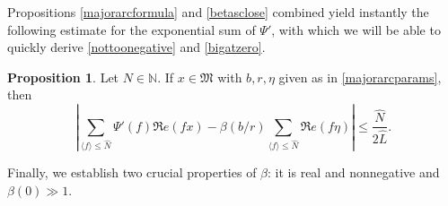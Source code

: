 \documentclass{article}
\theoremstyle{definition}
\newtheorem{prop}{Proposition}[section]
\theoremstyle{definition}
\theoremstyle{remark}
\newcommand{\N}{\mathbb{N}}
\newcommand{\1}{\mathbf{1}}
\numberwithin{equation}{section}
\begin{document}
Propositions \ref{majorarcformula} and \ref{betasclose} combined yield instantly the following estimate for the exponential sum of $\Psi'$, with which we will be able to quickly derive \eqref{nottoonegative} and \eqref{bigatzero}. 

\begin{prop}\label{majorarcestimate}
Let $N\in \N$. If $x\in \mathfrak{M}$ with $b,r,\eta$ given as in \eqref{majorarcparams}, then
\[\left|\sum_{\langle f\rangle \leq \widehat{N}} \Psi'(f)\Re e(fx)-\beta(b\slash r) \sum_{\langle f \rangle \leq \widehat{N}}\Re e(f\eta) \right|\leq \frac{\widehat{N}}{2\widehat{L}}.\]
\end{prop}

Finally, we establish two crucial properties of $\beta$: it is real and nonnegative and $\beta(0)\gg 1$. 
\end{document}
